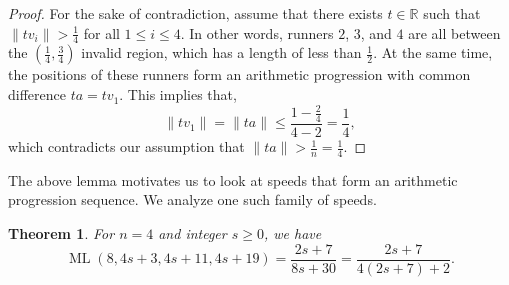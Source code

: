 \documentclass[11pt]{amsart}
\newtheorem{theorem}{Theorem}[section]
\newcommand{\norm}[1]{\lVert #1 \rVert}
\newcommand{\Norm}[1]{\left\lVert #1 \right\rVert}
\DeclareMathOperator{\ML}{ML}
\begin{document}
\begin{proof}
    For the sake of contradiction, assume that there exists $t \in \mathbb{R}$ such that $\Norm{tv_i} > \frac{1}{4}$ for all $1 \leq i \leq 4$. In other words, runners $2$, $3$, and $4$ are all between the $(\frac{1}{4},\frac{3}{4})$ invalid region, which has a length of less than $\frac{1}{2}$. At the same time, the positions of these runners form an arithmetic progression with common difference $ta = tv_1$. This implies that,
    $$\norm{tv_1} = \norm{ta} \leq \frac{1 - \frac{2}{4}}{4 - 2} = \frac{1}{4},$$
    which contradicts our assumption that $\norm{ta} > \frac{1}{n} = \frac{1}{4}$.
\end{proof}

The above lemma motivates us to look at speeds that form an arithmetic progression sequence. We analyze one such family of speeds.

\begin{theorem}
    \label{the0}
    For $n = 4$ and integer $s \geq 0$, we have
    $$\ML(8,4s + 3,4s + 11,4s + 19) = \frac{2s + 7}{8s + 30} = \frac{2s + 7}{4(2s + 7) + 2}.$$
\end{theorem}
\end{document}
